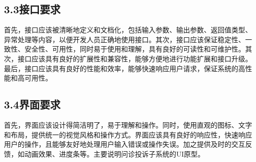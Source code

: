 \documentclass[24pt,a4paper]{article}%
\begin{document}
\subsection*{\songti 3.3接口要求}
首先，接口应该被清晰地定义和文档化，包括输入参数、输出参数、返回值类型、异常处理等内容，以便开发人员正确地使用接口。其次，接口应该保证稳定性、一致性、安全性、可用性，同时易于使用和理解，具有良好的可读性和可维护性。其次，接口应该具有良好的扩展性和兼容性，能够方便地进行功能扩展和接口升级。最后，接口应该具有良好的性能和效率，能够快速响应用户请求，保证系统的高性能和高可用性。
\subsection*{\songti 3.4界面要求}
首先，界面应该设计得简洁明了，易于理解和操作。同时，使用直观的图标、文字和布局，提供统一的视觉风格和操作方式。界面应该具有良好的响应性，快速响应用户的操作，且能够友好地处理用户输入错误或操作失误。加之提供及时的交互反馈，如动画效果、进度条等。主要说明问诊投诉子系统的UI原型。
\end{document}
